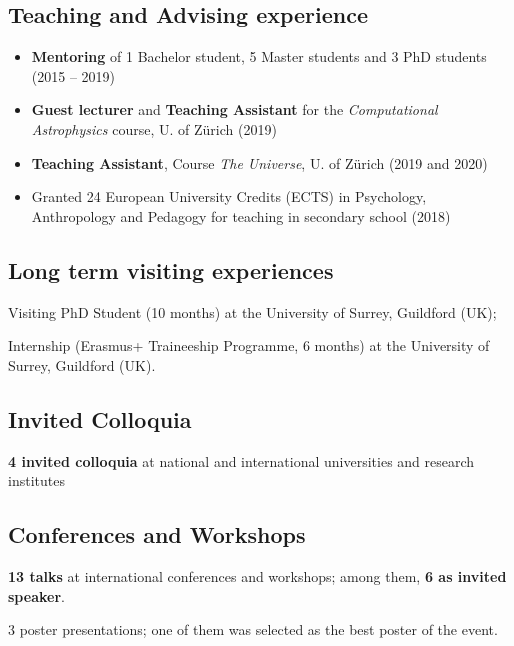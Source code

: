 \subsection*{{Teaching and Advising experience}}
\begin{itemize}[leftmargin=3.5mm]
\setlength\itemsep{-2pt}
\item
\textbf{Mentoring} of 1 Bachelor student, 5 Master students and 3 PhD students (2015 -- 2019)
\item \textbf{Guest lecturer} and \textbf{Teaching Assistant } for the  \textit{Computational Astrophysics} course, U. of Z\"urich (2019)
\item
\textbf{Teaching Assistant}, Course \textit{The Universe}, U. of Z\"urich (2019 and 2020)
\item Granted 24 European University Credits (ECTS)  in Psychology, Anthropology and
Pedagogy for teaching in secondary school (2018)
\end{itemize}


\subsection*{{Long term visiting experiences}}
\begin{description}
\setlength\itemsep{-2pt}
\item[\normalfont 2017:] {Visiting PhD Student} (10 months) at the {University of Surrey}, Guildford (UK);
\item[\normalfont 2015:] {Internship} (Erasmus+ Traineeship Programme, 6 months) at the {University of Surrey}, Guildford (UK).
\end{description}

\subsection*{{Invited Colloquia}}
\begin{description}
\setlength\itemsep{-2pt}
\item[\normalfont 2017 -- 2019:] \textbf{4 invited colloquia} at national and international universities and research institutes
\end{description}


\subsection*{Conferences and Workshops}
\begin{description}
\setlength\itemsep{-2pt}
\item \textbf{13 talks} at international conferences and workshops; among them, \textbf{6 as invited speaker}.
\item 3 poster presentations; one of them was selected as the best poster of the event.
\end{description}


